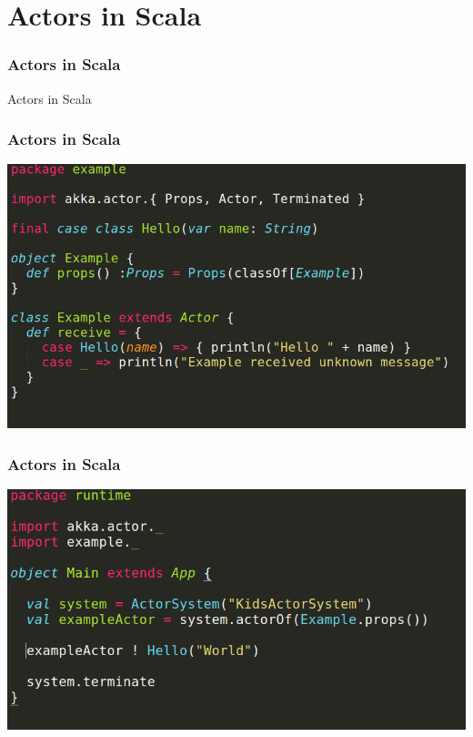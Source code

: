 \documentclass{beamer}
\begin{document}

\section{Actors in Scala}

\begin{frame}
\frametitle{Actors in Scala}
\Huge{\centerline{Actors in Scala}}
\end{frame}



\begin{frame}
\frametitle{Actors in Scala}
\includegraphics[width=1\linewidth]{./images/scala_example_actor.png}
\end{frame}


\begin{frame}
\frametitle{Actors in Scala}
\includegraphics[width=1\linewidth]{./images/scala_example_main.png}
\end{frame}
\end{document}
